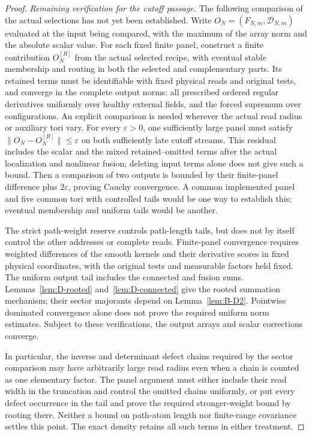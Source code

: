 \begin{proof}
\emph{Remaining verification for the cutoff passage.} The following comparison of the actual selections has not yet been established. Write $O_N=(F_{N,m},\mathcal D_{N,m})$ evaluated at the input being compared, with the maximum of the array norm and the absolute scalar value. For each fixed finite panel, construct a finite contribution $O_N^{[R]}$ from the actual selected recipe, with eventual stable membership and routing in both the selected and complementary parts. Its retained terms must be identifiable with fixed physical reads and original tests, and converge in the complete output norms: all prescribed ordered regular derivatives uniformly over healthy external fields, and the forced supremum over configurations. An explicit comparison is needed wherever the actual read radius or auxiliary tori vary. For every $\varepsilon>0$, one sufficiently large panel must satisfy $\|O_N-O_N^{[R]}\|\le\varepsilon$ on both sufficiently late cutoff streams. This residual includes the scalar and the mixed retained--omitted terms after the actual localization and nonlinear fusion; deleting input terms alone does not give such a bound. Then a comparison of two outputs is bounded by their finite-panel difference plus $2\varepsilon$, proving Cauchy convergence. A common implemented panel and five common tori with controlled tails would be one way to establish this; eventual membership and uniform tails would be another.

The strict path-weight reserve controls path-length tails, but does not by itself control the other addresses or complete reads. Finite-panel convergence requires weighted differences of the smooth kernels and their derivative scores in fixed physical coordinates, with the original tests and measurable factors held fixed. The uniform output tail includes the connected and fusion sums. Lemmas~\ref{lem:D-rooted} and~\ref{lem:D-connected} give the rooted summation mechanism; their sector majorants depend on Lemma~\ref{lem:B-D2}. Pointwise dominated convergence alone does not prove the required uniform norm estimates. Subject to these verifications, the output arrays and scalar corrections converge.

In particular, the inverse and determinant defect chains required by the sector comparison may have arbitrarily large read radius even when a chain is counted as one elementary factor. The panel argument must either include their read width in the truncation and control the omitted chains uniformly, or put every defect occurrence in the tail and prove the required stronger-weight bound by rooting there. Neither a bound on path-atom length nor finite-range covariance settles this point. The exact density retains all such terms in either treatment.


\end{proof}
